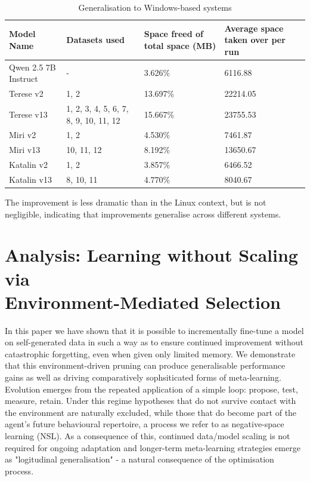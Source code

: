 \documentclass{article}
\begin{document}
\begin{table}[H]
    \centering
    \renewcommand{\arraystretch}{1.3}
    \footnotesize
    \begin{tabularx}{\textwidth}{|L|L|L|L|}
        \hline
        \textbf{Model Name} & 
        \textbf{Datasets used} & 
        \textbf{Space freed of total space (MB)} & 
        \textbf{Average space taken over per run} \\ 
        \hline
        Qwen 2.5 7B Instruct & - & 3.626\% & 6116.88 \\
        \hline
        Terese v2 & 1, 2 & 13.697\% & 22214.05 \\ 
        \hline
        Terese v13 & 1, 2, 3, 4, 5, 6, 7, 8, 9, 10, 11, 12 & 15.667\% & 23755.53 \\ 
        \hline
        Miri v2 & 1, 2 & 4.530\% & 7461.87 \\ 
        \hline
        Miri v13 & 10, 11, 12 & 8.192\% & 13650.67 \\ 
        \hline
        Katalin v2 & 1, 2 & 3.857\% & 6466.52 \\ 
        \hline
        Katalin v13 & 8, 10, 11 & 4.770\% & 8040.67 \\ 
        \hline
    \end{tabularx}
    \caption{Generalisation to Windows-based systems}
    \label{tab:windows_generalisation}
\end{table}
The improvement is less dramatic than in the Linux context, but is not negligible, indicating that improvements generalise across different systems. 

\section[Analysis: Learning without Scaling via Environment-Mediated Selection]{Analysis: Learning without Scaling via \\ Environment-Mediated Selection}
In this paper we have shown that it is possible to incrementally fine-tune a model on self-generated data in such a way as to ensure continued improvement without catastrophic forgetting, even when given only limited memory. We demonstrate that this environment-driven pruning can produce generalisable performance gains as well as driving comparatively sophsiticated forms of meta-learning. Evolution emerges from the repeated application of a simple loop: propose, test, measure, retain. Under this regime hypotheses that do not survive contact with the environment are naturally excluded, while those that do become part of the agent’s future behavioural repertoire, a process we refer to as negative-space learning (NSL).  As a consequence of this, continued data/model scaling is not required for ongoing adaptation and longer-term meta-learning strategies emerge as "logitudinal generalisation" - a natural consequence of the optimisation process. 
\end{document}
